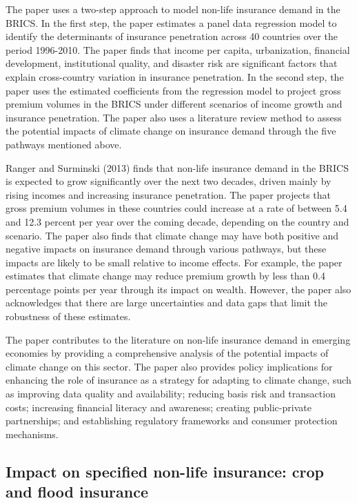 \documentclass[a4paper,12pt]{article}
\begin{document}
The paper uses a two-step approach to model non-life insurance demand in the BRICS. In the first step, the paper estimates a panel data regression model to identify the determinants of insurance penetration across 40 countries over the period 1996-2010. The paper finds that income per capita, urbanization, financial development, institutional quality, and disaster risk are significant factors that explain cross-country variation in insurance penetration. In the second step, the paper uses the estimated coefficients from the regression model to project gross premium volumes in the BRICS under different scenarios of income growth and insurance penetration. The paper also uses a literature review method to assess the potential impacts of climate change on insurance demand through the five pathways mentioned above.

Ranger and Surminski (2013) finds that non-life insurance demand in the BRICS is expected to grow significantly over the next two decades, driven mainly by rising incomes and increasing insurance penetration. The paper projects that gross premium volumes in these countries could increase at a rate of between 5.4 and 12.3 percent per year over the coming decade, depending on the country and scenario. The paper also finds that climate change may have both positive and negative impacts on insurance demand through various pathways, but these impacts are likely to be small relative to income effects. For example, the paper estimates that climate change may reduce premium growth by less than 0.4 percentage points per year through its impact on wealth. However, the paper also acknowledges that there are large uncertainties and data gaps that limit the robustness of these estimates.

The paper contributes to the literature on non-life insurance demand in emerging economies by providing a comprehensive analysis of the potential impacts of climate change on this sector. The paper also provides policy implications for enhancing the role of insurance as a strategy for adapting to climate change, such as improving data quality and availability; reducing basis risk and transaction costs; increasing financial literacy and awareness; creating public-private partnerships; and establishing regulatory frameworks and consumer protection mechanisms.

\subsection{Impact on specified non-life insurance: crop and flood insurance}
\end{document}
